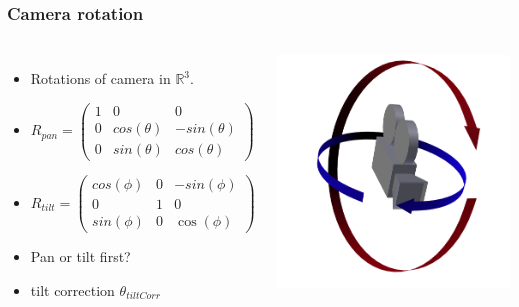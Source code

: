 \documentclass[9pt]{beamer}
\begin{document}
\begin{frame}
	\frametitle{Camera rotation}
	\begin{columns}
		\begin{itemize}
			\item Rotations of camera in $\mathbb{R}^3$.
			\item $R_{pan}=\begin{pmatrix}
						1 & 0 & 0\\
						0 & cos(\theta) & -sin(\theta)\\
						0 & sin(\theta) & cos(\theta)
					\end{pmatrix}$
			\item $R_{tilt}=\begin{pmatrix}
						cos(\phi) & 0 & -sin(\phi)\\
						0 & 1 & 0 \\
						sin(\phi) & 0 & \cos(\phi)
					\end{pmatrix}$
			\item  Pan or tilt first?
			\item  tilt correction $\theta_{tiltCorr}$
		\end{itemize}
		\includegraphics[width=\columnwidth]{../results/images/TiltPan.png}\\

\end{columns}
\end{frame}
\end{document}
